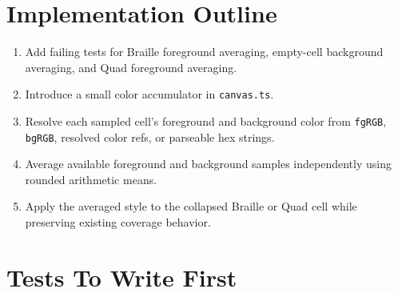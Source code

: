 \section{Implementation Outline}\label{record-158-implementation-outline}

\begin{enumerate}
\def\labelenumi{\arabic{enumi}.}
\tightlist
\item
  Add failing tests for Braille foreground averaging, empty-cell background averaging, and Quad foreground averaging.
\item
  Introduce a small color accumulator in \texttt{c\allowbreak{}a\allowbreak{}n\allowbreak{}v\allowbreak{}a\allowbreak{}s\allowbreak{}.\allowbreak{}t\allowbreak{}s}.
\item
  Resolve each sampled cell's foreground and background color from \texttt{f\allowbreak{}g\allowbreak{}R\allowbreak{}G\allowbreak{}B}, \texttt{b\allowbreak{}g\allowbreak{}R\allowbreak{}G\allowbreak{}B}, resolved color refs, or parseable hex strings.
\item
  Average available foreground and background samples independently using rounded arithmetic means.
\item
  Apply the averaged style to the collapsed Braille or Quad cell while preserving existing coverage behavior.
\end{enumerate}

\section{Tests To Write First}\label{record-158-tests-to-write-first}

